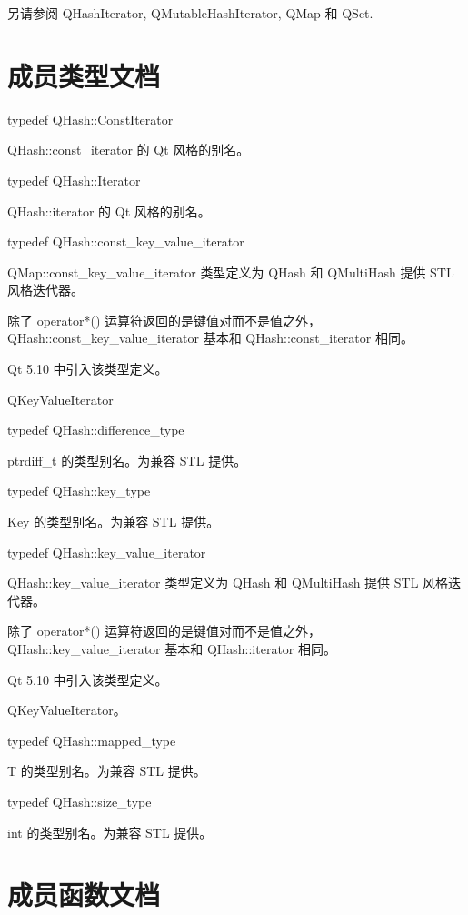 另请参阅 QHashIterator, QMutableHashIterator, QMap 和 QSet.

\section{成员类型文档}

typedef QHash::ConstIterator

QHash::const\_iterator 的 Qt 风格的别名。

typedef QHash::Iterator

QHash::iterator 的 Qt 风格的别名。

typedef QHash::const\_key\_value\_iterator

QMap::const\_key\_value\_iterator 类型定义为 QHash 和 QMultiHash 提供 STL 风格迭代器。

除了 operator*() 运算符返回的是键值对而不是值之外，QHash::const\_key\_value\_iterator 基本和 QHash::const\_iterator 相同。

Qt 5.10 中引入该类型定义。

\begin{notice}[另请参阅]
QKeyValueIterator
\end{notice}

typedef QHash::difference\_type

ptrdiff\_t 的类型别名。为兼容 STL 提供。

typedef QHash::key\_type

Key 的类型别名。为兼容 STL 提供。

typedef QHash::key\_value\_iterator

QHash::key\_value\_iterator 类型定义为 QHash 和 QMultiHash 提供 STL 风格迭代器。

除了 operator*() 运算符返回的是键值对而不是值之外，QHash::key\_value\_iterator 基本和 QHash::iterator 相同。

Qt 5.10 中引入该类型定义。

\begin{notice}[另请参阅]
QKeyValueIterator。
\end{notice}

typedef QHash::mapped\_type

T 的类型别名。为兼容 STL 提供。

typedef QHash::size\_type

int 的类型别名。为兼容 STL 提供。

\section{成员函数文档}

